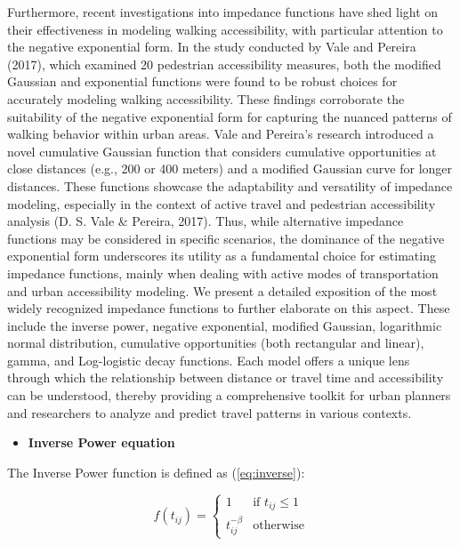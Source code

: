 \documentclass[
11pt, %
oneside, %
english, %
singlespacing, %
]{macthesis} %
\def\tightlist{}
\begin{document}
Furthermore, recent investigations into impedance functions have shed light on their effectiveness in modeling walking accessibility, with particular attention to the negative exponential form. In the study conducted by Vale and Pereira (2017), which examined 20 pedestrian accessibility measures, both the modified Gaussian and exponential functions were found to be robust choices for accurately modeling walking accessibility. These findings corroborate the suitability of the negative exponential form for capturing the nuanced patterns of walking behavior within urban areas. Vale and Pereira's research introduced a novel cumulative Gaussian function that considers cumulative opportunities at close distances (e.g., 200 or 400 meters) and a modified Gaussian curve for longer distances. These functions showcase the adaptability and versatility of impedance modeling, especially in the context of active travel and pedestrian accessibility analysis (D. S. Vale \& Pereira, 2017). Thus, while alternative impedance functions may be considered in specific scenarios, the dominance of the negative exponential form underscores its utility as a fundamental choice for estimating impedance functions, mainly when dealing with active modes of transportation and urban accessibility modeling. We present a detailed exposition of the most widely recognized impedance functions to further elaborate on this aspect. These include the inverse power, negative exponential, modified Gaussian, logarithmic normal distribution, cumulative opportunities (both rectangular and linear), gamma, and Log-logistic decay functions. Each model offers a unique lens through which the relationship between distance or travel time and accessibility can be understood, thereby providing a comprehensive toolkit for urban planners and researchers to analyze and predict travel patterns in various contexts.

\begin{itemize}
\tightlist
\item
  \textbf{Inverse Power equation}
\end{itemize}

The Inverse Power function is defined as (\ref{eq:inverse}):

\begin{equation}
f(t_{ij}) =
\begin{cases}
  1 & \text{if } t_{ij} \le 1 \\
  t_{ij}^{-\beta} & \text{otherwise}
\end{cases}
\label{eq:inverse}
\end{equation}
\end{document}
